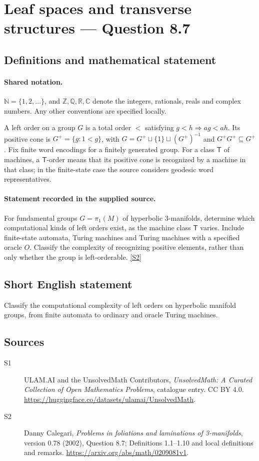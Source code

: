 \documentclass[11pt]{article}
\newcommand{\sref}[2]{\hyperlink{source:#1:#2}{[S#2]}}
\begin{document}
\section{Leaf spaces and transverse structures — Question 8.7}\label{statement}

\subsection{Definitions and mathematical statement}

\paragraph{Shared notation.}$\mathbb N=\{1,2,\ldots\}$, and $\mathbb Z,\mathbb Q,\mathbb R,\mathbb C$ denote the integers, rationals, reals and complex numbers. Any other conventions are specified locally.


A left order on a group $G$ is a total order $<$ satisfying $g<h\Rightarrow ag<ah$. Its positive cone is $G^+=\{g:1<g\}$, with $G=G^+\sqcup\{1\}\sqcup(G^+)^{-1}$ and $G^+G^+\subseteq G^+$. Fix finite word encodings for a finitely generated group. For a class $\mathsf T$ of machines, a $\mathsf T$-order means that its positive cone is recognized by a machine in that class; in the finite-state case the source considers geodesic word representatives.
\paragraph{Statement recorded in the supplied source.}
For fundamental groups $G=\pi_1(M)$ of hyperbolic $3$-manifolds, determine which computational kinds of left orders exist, as the machine class $\mathsf T$ varies. Include finite-state automata, Turing machines and Turing machines with a specified oracle $O$. Classify the complexity of recognizing positive elements, rather than only whether the group is left-orderable. \sref{statement}{2}
\subsection{Short English statement}
Classify the computational complexity of left orders on hyperbolic manifold groups, from finite automata to ordinary and oracle Turing machines.
\subsection{Sources}
\begin{description}
\item[\hypertarget{source:statement:1}{S1}] ULAM.AI and the UnsolvedMath Contributors, \emph{UnsolvedMath: A Curated Collection of Open Mathematics Problems}, catalogue entry. CC BY 4.0. \url{https://huggingface.co/datasets/ulamai/UnsolvedMath}.
\item[\hypertarget{source:statement:2}{S2}] Danny Calegari, \emph{Problems in foliations and laminations of 3-manifolds}, version 0.78 (2002), Question 8.7; Definitions 1.1--1.10 and local definitions and remarks. \url{https://arxiv.org/abs/math/0209081v1}.
\end{description}
\label{end:statement}
\end{document}
